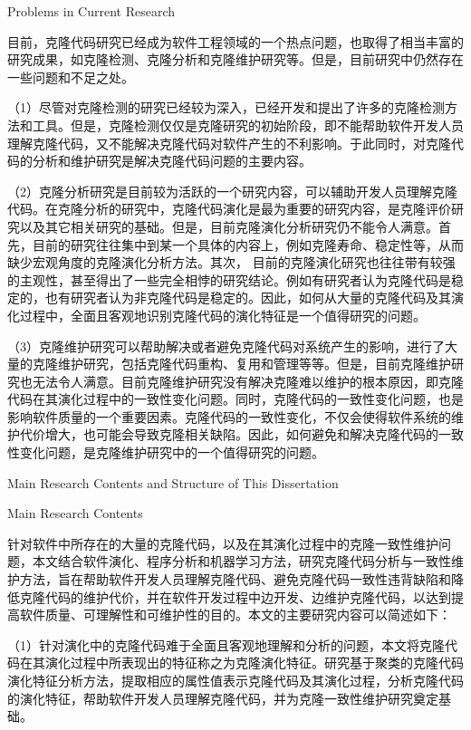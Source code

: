 {Problems in Current Research}

目前，克隆代码研究已经成为软件工程领域的一个热点问题，也取得了相当丰富的研究成果，如克隆检测、克隆分析和克隆维护研究等。但是，目前研究中仍然存在一些问题和不足之处。

（1）尽管对克隆检测的研究已经较为深入，已经开发和提出了许多的克隆检测方法和工具。但是，克隆检测仅仅是克隆研究的初始阶段，即不能帮助软件开发人员理解克隆代码，又不能解决克隆代码对软件产生的不利影响。于此同时，对克隆代码的分析和维护研究是解决克隆代码问题的主要内容。

（2）克隆分析研究是目前较为活跃的一个研究内容，可以辅助开发人员理解克隆代码。在克隆分析的研究中，克隆代码演化是最为重要的研究内容，是克隆评价研究以及其它相关研究的基础。但是，目前克隆演化分析研究仍不能令人满意。首先，目前的研究往往集中到某一个具体的内容上，例如克隆寿命、稳定性等，从而缺少宏观角度的克隆演化分析方法。其次， 目前的克隆演化研究也往往带有较强的主观性，甚至得出了一些完全相悖的研究结论。例如有研究者认为克隆代码是稳定的，也有研究者认为非克隆代码是稳定的。因此，如何从大量的克隆代码及其演化过程中，全面且客观地识别克隆代码的演化特征是一个值得研究的问题。

（3）克隆维护研究可以帮助解决或者避免克隆代码对系统产生的影响，进行了大量的克隆维护研究，包括克隆代码重构、复用和管理等等。但是，目前克隆维护研究也无法令人满意。目前克隆维护研究没有解决克隆难以维护的根本原因，即克隆代码在其演化过程中的一致性变化问题。同时，克隆代码的一致性变化问题，也是影响软件质量的一个重要因素。克隆代码的一致性变化，不仅会使得软件系统的维护代价增大，也可能会导致克隆相关缺陷。因此，如何避免和解决克隆代码的一致性变化问题，是克隆维护研究中的一个值得研究的问题。

{Main Research Contents and Structure of This Dissertation}

{Main Research Contents}

针对软件中所存在的大量的克隆代码，以及在其演化过程中的克隆一致性维护问题，本文结合软件演化、程序分析和机器学习方法，研究克隆代码分析与一致性维护方法，旨在帮助软件开发人员理解克隆代码、避免克隆代码一致性违背缺陷和降低克隆代码的维护代价，并在软件开发过程中边开发、边维护克隆代码，以达到提高软件质量、可理解性和可维护性的目的。本文的主要研究内容可以简述如下：

（1）针对演化中的克隆代码难于全面且客观地理解和分析的问题，本文将克隆代码在其演化过程中所表现出的特征称之为克隆演化特征。研究基于聚类的克隆代码演化特征分析方法，提取相应的属性值表示克隆代码及其演化过程，分析克隆代码的演化特征，帮助软件开发人员理解克隆代码，并为克隆一致性维护研究奠定基础。


